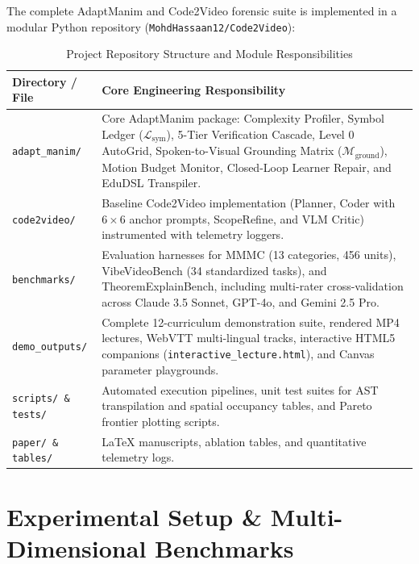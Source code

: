 \documentclass[11pt, a4paper]{article}
\begin{document}
The complete AdaptManim and Code2Video forensic suite is implemented in a modular Python repository (\texttt{MohdHassaan12/Code2Video}):

\begin{table}[htbp]
\centering
\small
\caption{Project Repository Structure and Module Responsibilities}
\vspace{0.4em}
\begin{tabularx}{\textwidth}{l X}
\toprule
\textbf{Directory / File} & \textbf{Core Engineering Responsibility} \\
\midrule
\texttt{adapt\_manim/} & Core AdaptManim package: Complexity Profiler, Symbol Ledger ($\mathcal{L}_{\text{sym}}$), 5-Tier Verification Cascade, Level 0 AutoGrid, Spoken-to-Visual Grounding Matrix ($\mathcal{M}_{\text{ground}}$), Motion Budget Monitor, Closed-Loop Learner Repair, and EduDSL Transpiler. \\
\texttt{code2video/} & Baseline Code2Video implementation (Planner, Coder with $6\times 6$ anchor prompts, ScopeRefine, and VLM Critic) instrumented with telemetry loggers. \\
\texttt{benchmarks/} & Evaluation harnesses for MMMC (13 categories, 456 units), VibeVideoBench (34 standardized tasks), and TheoremExplainBench, including multi-rater cross-validation across Claude 3.5 Sonnet, GPT-4o, and Gemini 2.5 Pro. \\
\texttt{demo\_outputs/} & Complete 12-curriculum demonstration suite, rendered MP4 lectures, WebVTT multi-lingual tracks, interactive HTML5 companions (\texttt{interactive\_lecture.html}), and Canvas parameter playgrounds. \\
\texttt{scripts/ \& tests/} & Automated execution pipelines, unit test suites for AST transpilation and spatial occupancy tables, and Pareto frontier plotting scripts. \\
\texttt{paper/ \& tables/} & \LaTeX{} manuscripts, ablation tables, and quantitative telemetry logs. \\
\bottomrule
\end{tabularx}
\end{table}

\section{Experimental Setup \& Multi-Dimensional Benchmarks}
\end{document}
